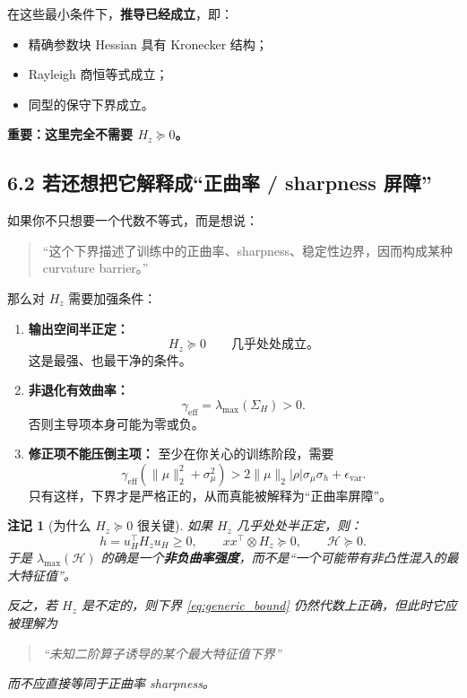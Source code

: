 \documentclass[11pt]{ctexart}
\newtheorem{remark}{注记}
\begin{document}
在这些最小条件下，\textbf{推导已经成立}，即：
\begin{itemize}
    \item 精确参数块 Hessian 具有 Kronecker 结构；
    \item Rayleigh 商恒等式成立；
    \item 同型的保守下界成立。
\end{itemize}

\textbf{重要：这里完全不需要 $H_z \succeq 0$。}

\subsection*{6.2 若还想把它解释成“正曲率 / sharpness 屏障”}

如果你不只想要一个代数不等式，而是想说：

\begin{quote}
“这个下界描述了训练中的正曲率、sharpness、稳定性边界，因而构成某种 curvature barrier。”
\end{quote}

那么对 $H_z$ 需要加强条件：

\begin{enumerate}[label=\textbf{(C\arabic*)}]
    \item \textbf{输出空间半正定：}
    \[
    H_z \succeq 0 \qquad \text{几乎处处成立。}
    \]
    这是最强、也最干净的条件。

    \item \textbf{非退化有效曲率：}
    \[
    \gamma_{\mathrm{eff}} = \lambda_{\max}(\Sigma_H) > 0.
    \]
    否则主导项本身可能为零或负。

    \item \textbf{修正项不能压倒主项：}
    至少在你关心的训练阶段，需要
    \[
    \gamma_{\mathrm{eff}}(\|\mu\|_2^2 + \sigma_\mu^2)
    >
    2\|\mu\|_2 |\rho| \sigma_\mu \sigma_h + \epsilon_{\mathrm{var}}.
    \]
    只有这样，下界才是严格正的，从而真能被解释为“正曲率屏障”。
\end{enumerate}

\begin{remark}[为什么 $H_z \succeq 0$ 很关键]
如果 $H_z$ 几乎处处半正定，则：
\[
h = u_H^\top H_z u_H \ge 0,
\qquad
xx^\top \otimes H_z \succeq 0,
\qquad
\mathcal{H} \succeq 0.
\]
于是 $\lambda_{\max}(\mathcal{H})$ 的确是一个\textbf{非负曲率强度}，而不是“一个可能带有非凸性混入的最大特征值”。

反之，若 $H_z$ 是不定的，则下界 \eqref{eq:generic_bound} 仍然代数上正确，但此时它应被理解为
\begin{quote}
“未知二阶算子诱导的某个最大特征值下界”
\end{quote}
而不应直接等同于正曲率 sharpness。
\end{remark}
\end{document}
